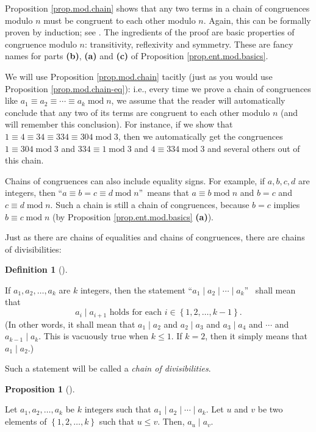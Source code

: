 \documentclass[numbers=enddot,12pt,final,onecolumn,notitlepage]{scrartcl}%
\numberwithin{exer}{subsection}
\theoremstyle{definition}
\newtheorem{prop}[theo]{Proposition}
\newenvironment{proposition}[1][]
{\begin{prop}[#1]\begin{leftbar}}
{\end{leftbar}\end{prop}}
\newtheorem{defi}[theo]{Definition}
\newenvironment{definition}[1][]
{\begin{defi}[#1]\begin{leftbar}}
{\end{leftbar}\end{defi}}
\begin{document}
Proposition \ref{prop.mod.chain} shows that any two terms in a chain of
congruences modulo $n$ must be congruent to each other modulo $n$. Again, this
can be formally proven by induction; see \cite[proof of Proposition
2.16]{detnotes}. The ingredients of the proof are basic properties of
congruence modulo $n$: transitivity, reflexivity and symmetry. These are fancy
names for parts \textbf{(b)}, \textbf{(a)} and \textbf{(c)} of Proposition
\ref{prop.ent.mod.basics}.

We will use Proposition \ref{prop.mod.chain} tacitly (just as you would use
Proposition \ref{prop.mod.chain-eq}): i.e., every time we prove a chain of
congruences like $a_{1}\equiv a_{2}\equiv\cdots\equiv a_{k}\operatorname{mod}%
n$, we assume that the reader will automatically conclude that any two of its
terms are congruent to each other modulo $n$ (and will remember this
conclusion). For instance, if we show that $1\equiv4\equiv34\equiv
334\equiv304\operatorname{mod}3$, then we automatically get the congruences
$1\equiv304\operatorname{mod}3$ and $334\equiv1\operatorname{mod}3$ and
$4\equiv334\operatorname{mod}3$ and several others out of this chain.

Chains of congruences can also include equality signs. For example, if
$a,b,c,d$ are integers, then \textquotedblleft$a\equiv b=c\equiv
d\operatorname{mod}n$\textquotedblright\ means that $a\equiv
b\operatorname{mod}n$ and $b=c$ and $c\equiv d\operatorname{mod}n$. Such a
chain is still a chain of congruences, because $b=c$ implies $b\equiv
c\operatorname{mod}n$ (by Proposition \ref{prop.ent.mod.basics} \textbf{(a)}).

Just as there are chains of equalities and chains of congruences, there are
chains of divisibilities:

\begin{definition}
If $a_{1},a_{2},\ldots,a_{k}$ are $k$ integers, then the statement
\textquotedblleft$a_{1}\mid a_{2}\mid\cdots\mid a_{k}$\textquotedblright%
\ shall mean that
\[
a_{i}\mid a_{i+1}\text{ holds for each }i\in\left\{  1,2,\ldots,k-1\right\}
.
\]
(In other words, it shall mean that $a_{1}\mid a_{2}$ and $a_{2}\mid a_{3}$
and $a_{3}\mid a_{4}$ and $\cdots$ and $a_{k-1}\mid a_{k}$. This is vacuously
true when $k\leq1$. If $k=2$, then it simply means that $a_{1}\mid a_{2}$.)

Such a statement will be called a \textit{chain of divisibilities}.
\end{definition}

\begin{proposition}
\label{prop.ent.div.chain}Let $a_{1},a_{2},\ldots,a_{k}$ be $k$ integers such
that $a_{1}\mid a_{2}\mid\cdots\mid a_{k}$. Let $u$ and $v$ be two elements of
$\left\{  1,2,\ldots,k\right\}  $ such that $u\leq v$. Then, $a_{u}\mid a_{v}$.
\end{proposition}
\end{document}
